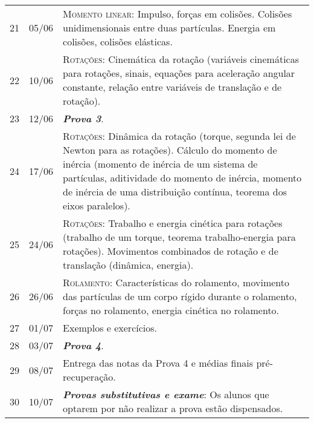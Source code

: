 \begin{center}
\begin{longtable}{ccp{70mm}}
21	 & 	05/06	 & 	\textsc{Momento linear:} Impulso, forças em colisões. Colisões unidimensionais entre duas partículas. Energia em colisões, colisões elásticas. \\
22	 & 	10/06	 & 	\textsc{Rotações:} Cinemática da rotação (variáveis cinemáticas para rotações, sinais, equações para aceleração angular constante, relação entre variáveis de translação e de rotação). \\
23	 & 	12/06	 & 	\textbf{\textit{Prova 3}}. \\
24	 & 	17/06	 & 	\textsc{Rotações:} Dinâmica da rotação (torque, segunda lei de Newton para as rotações). Cálculo do momento de inércia (momento de inércia de um sistema de partículas, aditividade do momento de inércia, momento de inércia de uma distribuição contínua, teorema dos eixos paralelos). \\
25	 & 	24/06	 & 	\textsc{Rotações:} Trabalho e energia cinética para rotações (trabalho de um torque, teorema trabalho-energia para rotações). Movimentos combinados de rotação e de translação (dinâmica, energia). \\
26	 & 	26/06	 & 	\textsc{Rolamento:} Características do rolamento, movimento das partículas de um corpo rígido durante o rolamento, forças no rolamento, energia cinética no rolamento. \\
27	 & 	01/07	 & 	Exemplos e exercícios. \\
28	 &  	03/07	 & 	\textbf{\textit{Prova 4}}. \\
29	 & 	08/07	 & 	Entrega das notas da Prova 4 e médias finais pré-recuperação. \\
30	 & 	10/07	 & 	\textbf{\textit{Provas substitutivas e exame}}: Os alunos que optarem por não realizar a prova estão dispensados. \\
\end{longtable}
\end{center}


\cleardoublepage

